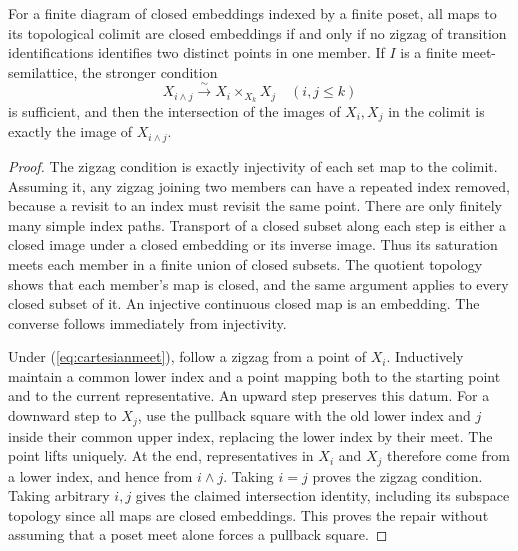 \begin{result}\label{A4.3}
For a finite diagram of closed embeddings indexed by a finite poset,
all maps to its topological colimit are closed embeddings if and only if
no zigzag of transition identifications identifies two distinct points
in one member. If $I$ is a finite meet-semilattice, the stronger condition
\[
 X_{i\wedge j}\xrightarrow{\sim}X_i\times_{X_k}X_j
 \quad(i,j\leq k)
\tag{A.4.1}\label{eq:cartesianmeet}
\]
is sufficient, and then the intersection of the images of $X_i,X_j$ in
the colimit is exactly the image of $X_{i\wedge j}$.
\end{result}
\begin{proof}
The zigzag condition is exactly injectivity of each set map to the
colimit. Assuming it, any zigzag joining two members can have a repeated
index removed, because a revisit to an index must revisit the same
point. There are only finitely many simple index paths. Transport of a
closed subset along each step is either a closed image under a closed
embedding or its inverse image. Thus its saturation meets each member
in a finite union of closed subsets. The quotient topology shows that
each member's map is closed, and the same argument applies to every
closed subset of it. An injective continuous closed map is an embedding.
The converse follows immediately from injectivity.

Under (\ref{eq:cartesianmeet}), follow a zigzag from a point of $X_i$.
Inductively maintain a common lower index and a point mapping both to
the starting point and to the current representative. An upward step
preserves this datum. For a downward step to $X_j$, use the pullback
square with the old lower index and $j$ inside their common upper
index, replacing the lower index by their meet. The point lifts
uniquely. At the end, representatives in $X_i$ and $X_j$ therefore come
from a lower index, and hence from $i\wedge j$. Taking $i=j$ proves the
zigzag condition. Taking arbitrary $i,j$ gives the claimed intersection
identity, including its subspace topology since all maps are closed
embeddings. This proves the repair without assuming that a poset
meet alone forces a pullback square.
\end{proof}

